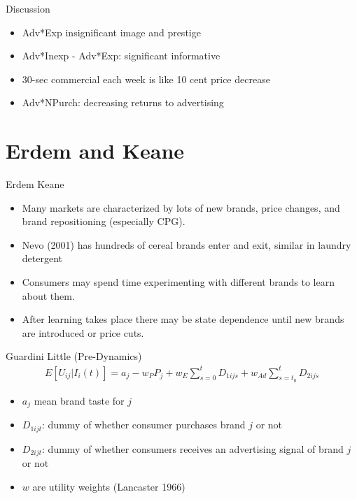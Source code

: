 \documentclass[xcolor=pdftex,dvipsnames,table,mathserif]{beamer}
\begin{document}
\begin{frame}{Discussion}
\begin{itemize}
\item Adv*Exp \alert{insignificant} image and prestige
\item Adv*Inexp - Adv*Exp: \alert{significant} informative
\item 30-sec commercial each week is like 10 cent price decrease
\item Adv*NPurch: decreasing returns to advertising
\end{itemize}
\end{frame}

\section*{Erdem and Keane}

\begin{frame}{Erdem Keane}
\begin{itemize}
\item Many markets are characterized by lots of new brands, price changes, and brand repositioning (especially CPG).
\item Nevo (2001) has hundreds of cereal brands enter and exit, similar in laundry detergent
\item Consumers may spend time experimenting with different brands to learn about them.
\item After learning takes place there may be state dependence until new brands are introduced or price cuts.
\end{itemize}
\end{frame} 

\begin{frame}{Guardini Little (Pre-Dynamics)}
\begin{eqnarray*}
E[U_{ij} | I_i(t) ] = a_j -w_P P_j + w_E \sum_{s=0}^t D_{1ijs}  + w_{Ad} \sum_{s=t_0}^t D_{2ijs}
\end{eqnarray*}
\begin{itemize}
\item $a_j$ mean brand taste for $j$
\item $D_{1ijt}$: dummy of whether consumer purchases brand $j$ or not
\item $D_{2ijt}$: dummy of whether consumers receives an advertising signal of brand $j$ or not
\item $w$ are utility weights (Lancaster 1966)
\end{itemize}
\end{frame} 
\end{document}
